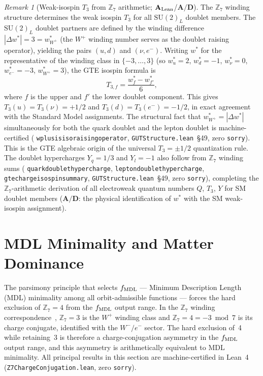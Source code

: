 \documentclass[11pt]{article}
\theoremstyle{remark}
\newtheorem{remark}[theorem]{Remark}
\newcommand{\lean}[1]{%
  \penalty-100
  \begingroup\def\_{\textunderscore\allowbreak}\texttt{#1}\endgroup}
\newcommand{\CatAL}{\ensuremath{\textbf{A}_{\rm Lean}}}
\newcommand{\CatAD}{\textbf{A/D}}
\begin{document}
\begin{remark}[Weak-isospin $T_3$ from $\mathbb{Z}_7$ arithmetic; $\CatAL$/$\CatAD$]
\label{rem:t3_derivation}
The $\mathbb{Z}_7$ winding structure determines the weak isospin $T_3$ for all
$\mathrm{SU}(2)_L$ doublet members.
The $\mathrm{SU}(2)_L$ doublet partners are defined by the winding difference
$|\Delta w^*| = 3 = w_{W^+}^*$ (the $W^+$ winding number serves as the doublet
raising operator), yielding the pairs $(u,d)$ and $(\nu,e^-)$.
Writing $w^*$ for the representative of the winding class in $\{-3,\ldots,3\}$
(so $w_u^*=2$, $w_d^*=-1$, $w_\nu^*=0$, $w_{e^-}^*=-3$, $w_{W^+}^*=3$),
the GTE isospin formula is
\begin{equation}
  T_{3,f} = \frac{w_f^* - w_{f'}^*}{6},
  \label{eq:t3_formula}
\end{equation}
where $f$ is the upper and $f'$ the lower doublet component.
This gives $T_3(u) = T_3(\nu) = +1/2$ and $T_3(d) = T_3(e^-) = -1/2$, in exact
agreement with the Standard Model assignments.
The structural fact that $w_{W^+}^* = |\Delta w^*|$ simultaneously for both the
quark doublet and the lepton doublet is machine-certified
(\lean{wplus\_is\_iso\_raising\_operator},
\lean{GUTStructure.lean}~\S49, zero \texttt{sorry}).
This is the GTE algebraic origin of the universal $T_3 = \pm 1/2$ quantization rule.
The doublet hypercharges $Y_q = 1/3$ and $Y_l = -1$ also follow from
$\mathbb{Z}_7$ winding sums
(\lean{quark\_doublet\_hypercharge},
\lean{lepton\_doublet\_hypercharge},
\lean{gte\_charge\_isospin\_summary},
\lean{GUTStructure.lean}~\S49, zero \texttt{sorry}),
completing the $\mathbb{Z}_7$-arithmetic derivation of all electroweak quantum
numbers $Q$, $T_3$, $Y$ for SM doublet members
($\CatAD$: the physical identification of $w^*$ with the SM weak-isospin
assignment).
\end{remark}

\section{MDL Minimality and Matter Dominance}
\label{sec:mdl_cp}

The parsimony principle that selects $f_{\rm MDL}$ --- Minimum Description
Length (MDL) minimality among all orbit-admissible functions --- forces the
hard exclusion of $\mathbb{Z}_7 = 4$ from the $f_{\rm MDL}$ output range.
In the $\mathbb{Z}_7$ winding correspondence~\cite{Spivack2026_SM_UGP},
$\mathbb{Z}_7 = 3$ is the $W^+$ winding class and $\mathbb{Z}_7 = 4 = -3
\bmod 7$ is its charge conjugate, identified with the $W^-/e^-$ sector.
The hard exclusion of~4 while retaining~3 is therefore a charge-conjugation
asymmetry in the $f_{\rm MDL}$ output range, and this asymmetry is
arithmetically equivalent to MDL minimality.
All principal results in this section are machine-certified in Lean~4
(\texttt{Z7ChargeConjugation.lean}, zero \texttt{sorry}).
\end{document}
